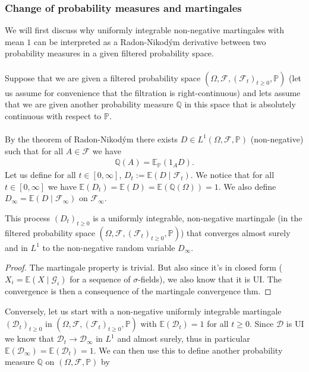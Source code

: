 \documentclass[../mainfile.tex]{subfiles}
\begin{document}
\subsubsection{Change of probability measures and martingales}
We will first discuss why uniformly integrable non-negative martingales with mean $1$ can be interpreted as a Radon-Nikodým derivative between two probability measures in a given filtered probability space. 
\\
\\
Suppose that we are given a filtered probability space $( \Omega, \mathcal{F}, ( \mathcal{F}_t)_{t \geq 0}, \mathbb{P})$ (let us assume for convenience that the filtration is right-continuous) and lets assume that we are given another probability measure $\mathbb{Q}$ in this space that is absolutely continuous with respect to $\mathbb{P}$. 
\\\\
By the theorem of Radon-Nikodým there exists $D \in L^1( \Omega, \mathcal{F}, \mathbb{P})$ (non-negative) such that for all $A \in \mathcal{F}$ we have
\begin{align*}
\mathbb{Q}(A)= \mathbb{E}_\mathbb{P}(1_AD).
\end{align*}
Let us define for all $t \in [0, \infty]$, $D_t:= \mathbb{E}(D \mid \mathcal{F}_t)$. We notice that for all $t \in [0, \infty]$ we have $\mathbb{E}(D_t)= \mathbb{E}(D)= \mathbb{E}( \mathbb{Q}( \Omega))= 1$. We also define $D_\infty = \mathbb{E}(D \mid \mathcal{F}_\infty)$ on $\mathcal{F}_\infty$. 
\begin{prop} This process $(D_t)_{t \geq 0}$ is a uniformly integrable, non-negative martingale (in the filtered probability space $( \Omega, \mathcal{F}, ( \mathcal{F}_t)_{t \geq 0}, \mathbb{P})$) that converges almost surely and in $L^1$ to the non-negative random variable $D_\infty$. 
\end{prop}
\begin{proof}
The martingale property is trivial. But also since it's in closed form ($X_i= \mathbb{E}(X \mid \mathcal{G}_i)$ for a sequence of $\sigma$-fields),  we also know that it is UI. The convergence is then a consequence of the martingale convergence thm. 
\end{proof}
Conversely, let us start with a non-negative uniformly integrable martingale $( \mathcal{D}_t)_{t \geq 0}$ in $(\Omega, \mathcal{F}, (\mathcal{F}_t)_{t \geq 0}, \mathbb{P})$ with $\mathbb{E}( \mathcal{D}_t)=1$ for all $t \geq 0$. Since $\mathcal{D}$ is UI we know that $\mathcal{D}_t \to \mathcal{D}_\infty$ in $L^1$ and almost surely, thus in particular $\mathbb{E}( \mathcal{D}_\infty)= \mathbb{E}(\mathcal{D}_t)=1$. We can then use this to define another probability measure $\mathbb{Q}$ on $( \Omega, \mathcal{F}, \mathbb{P})$ by 
\end{document}
